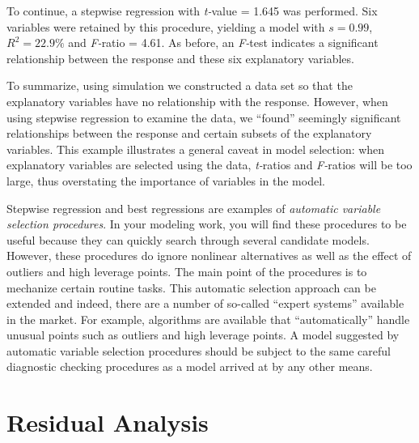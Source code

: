 To continue, a stepwise regression with \textit{t-}value = 1.645 was
performed. Six variables were retained by this procedure, yielding a
model with $s=0.99$, $R^2=22.9\%$ and \textit{F-}ratio = 4.61. As
before, an \textit{F-}test indicates a significant relationship
between the response and these six explanatory variables.


To summarize, using simulation we constructed a data set so that the
explanatory variables have no relationship with the response.
However, when using stepwise regression to examine the data, we
``found'' seemingly significant relationships between the response
and certain subsets of the explanatory variables. This example
illustrates a general caveat in model selection: when explanatory
variables are selected using the data, \textit{t-}ratios and
\textit{F-}ratios will be too large, thus overstating the importance
of variables in the model.

\linejed

\newpage


Stepwise regression and best regressions are examples of
\textit{automatic variable selection procedures}. In your modeling
work, you will find these procedures to be useful because they can
quickly search through several candidate models. However, these
procedures do ignore nonlinear alternatives as well as the effect of
outliers and high leverage points. The main point of the procedures
is to mechanize certain routine tasks. This automatic selection
approach can be extended and indeed, there are a number of so-called
``expert systems'' available in the market. For example, algorithms
are available that ``automatically'' handle unusual points such as
outliers and high leverage points. A model suggested by automatic
variable selection procedures should be subject to the same careful
diagnostic checking procedures as a model arrived at by any other
means.

\section{Residual Analysis}\label{S5:ResidualAnalysis}


